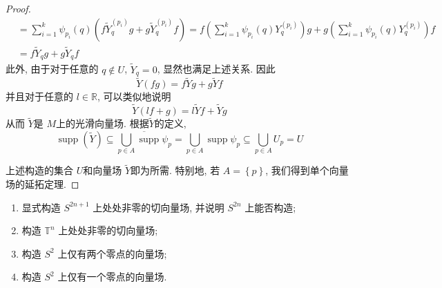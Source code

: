 \documentclass[../main.tex]{subfiles}
\begin{document}
\begin{proof}
\[\begin{aligned}
      &= \sum _{i= 1}^{k}\psi _{p_{i}}\left( q \right)  \left( f \tilde{Y}_{q}^{\left( p_{i} \right) }g+  g \tilde{Y}_{q}^{\left( p_{i} \right) }f \right)= f \left( \sum _{i= 1}^{k}\psi _{p_{i}}\left( q \right)  Y_{q}^{\left( p_{i} \right) } \right) g+  g \left( \sum _{i= 1}^{k}\psi_{p_{i}}\left( q \right) Y_{q}^{\left( p_{i} \right) } \right)f \\ 
       &= f \tilde{Y}_{q}g+  g \tilde{Y}_{q}f
   \end{aligned}   
    \]此外, 由于对于任意的 \(  q \not \in U  \),  \(  \tilde{Y}_{q}= 0  \), 显然也满足上述关系.  因此 \[
    \tilde{Y} \left( fg \right)=  f \tilde{Y}g+ g \tilde{Y} f 
    \]并且对于任意的 \(  l\in  \mathbb{R}   \), 可以类似地说明 \[
    \tilde{Y} \left( lf+ g \right)= l \tilde{Y}f+ \tilde{Y}g 
    \]   从而 \(  \tilde{Y}  \)是 \(  M  \)上的光滑向量场.  根据\(  \tilde{Y}  \)的定义,  \[
    \operatorname{supp}\left( \tilde{Y} \right)\subseteq   \overline{\bigcup _{p \in A} \operatorname{supp}\psi _{p}}= \bigcup _{p \in A} \operatorname{supp}\psi _{p}\subseteq \bigcup _{p \in A}U_{p}= U 
    \]   

    上述构造的集合 \(  U  \)和向量场 \(  \tilde{Y}  \)即为所需. 特别地, 若 \(  A= \left\{ p \right\}  \), 我们得到单个向量场的延拓定理.   
\end{proof}
\begin{exercise}{}{}
\begin{enumerate}
    \item[a).] 显式构造 $S^{2n+1}$ 上处处非零的切向量场, 并说明 $S^{2n}$ 上能否构造;
    \item[b).] 构造 $\mathbb{T}^n$ 上处处非零的切向量场;
    \item[c).] 构造 $S^2$ 上仅有两个零点的向量场;
    \item[d).] 构造 $S^2$ 上仅有一个零点的向量场.
\end{enumerate}
\end{exercise}
\end{document}
